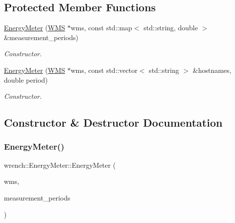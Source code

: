 \subsection*{Protected Member Functions}
\begin{DoxyCompactItemize}
\item 
\hyperlink{classwrench_1_1_energy_meter_a8533895c6eb032027069d3cd04b9f8f1}{Energy\+Meter} (\hyperlink{classwrench_1_1_w_m_s}{W\+MS} $\ast$wms, const std\+::map$<$ std\+::string, double $>$ \&measurement\+\_\+periods)
\begin{DoxyCompactList}\small\item\em Constructor. \end{DoxyCompactList}\item 
\hyperlink{classwrench_1_1_energy_meter_a31196bca18a3db3804c4bafd32770c64}{Energy\+Meter} (\hyperlink{classwrench_1_1_w_m_s}{W\+MS} $\ast$wms, const std\+::vector$<$ std\+::string $>$ \&hostnames, double period)
\begin{DoxyCompactList}\small\item\em Constructor. \end{DoxyCompactList}\end{DoxyCompactItemize}


\subsection{Constructor \& Destructor Documentation}
\mbox{\label{classwrench_1_1_energy_meter_a8533895c6eb032027069d3cd04b9f8f1}} 
\subsubsection{\texorpdfstring{Energy\+Meter()}{EnergyMeter()}\hspace{0.1cm}{\footnotesize\ttfamily [1/2]}}
{\footnotesize\ttfamily wrench\+::\+Energy\+Meter\+::\+Energy\+Meter (\begin{DoxyParamCaption}\item[{\hyperlink{classwrench_1_1_w_m_s}{W\+MS} $\ast$}]{wms,  }\item[{const std\+::map$<$ std\+::string, double $>$ \&}]{measurement\+\_\+periods }\end{DoxyParamCaption})\hspace{0.3cm}{\ttfamily [protected]}}



